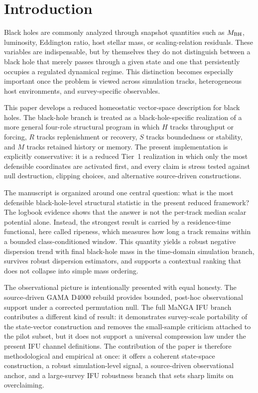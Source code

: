 \documentclass[11pt]{article}
\begin{document}
\section{Introduction}

Black holes are commonly analyzed through snapshot quantities such as $M_{\rm BH}$, luminosity, Eddington ratio, host stellar mass, or scaling-relation residuals. These variables are indispensable, but by themselves they do not distinguish between a black hole that merely passes through a given state and one that persistently occupies a regulated dynamical regime. This distinction becomes especially important once the problem is viewed across simulation tracks, heterogeneous host environments, and survey-specific observables.

This paper develops a reduced homeostatic vector-space description for black holes. The black-hole branch is treated as a black-hole-specific realization of a more general four-role structural program in which $H$ tracks throughput or forcing, $R$ tracks replenishment or recovery, $S$ tracks boundedness or stability, and $M$ tracks retained history or memory. The present implementation is explicitly conservative: it is a reduced Tier~1 realization in which only the most defensible coordinates are activated first, and every claim is stress tested against null destruction, clipping choices, and alternative source-driven constructions.

The manuscript is organized around one central question: what is the most defensible black-hole-level structural statistic in the present reduced framework? The logbook evidence shows that the answer is not the per-track median scalar potential alone. Instead, the strongest result is carried by a residence-time functional, here called ripeness, which measures how long a track remains within a bounded class-conditioned window. This quantity yields a robust negative dispersion trend with final black-hole mass in the time-domain simulation branch, survives robust dispersion estimators, and supports a contextual ranking that does not collapse into simple mass ordering.

The observational picture is intentionally presented with equal honesty. The source-driven GAMA D4000 rebuild provides bounded, post-hoc observational support under a corrected permutation null. The full MaNGA IFU branch contributes a different kind of result: it demonstrates survey-scale portability of the state-vector construction and removes the small-sample criticism attached to the pilot subset, but it does not support a universal compression law under the present IFU channel definitions. The contribution of the paper is therefore methodological and empirical at once: it offers a coherent state-space construction, a robust simulation-level signal, a source-driven observational anchor, and a large-survey IFU robustness branch that sets sharp limits on overclaiming.
\end{document}
